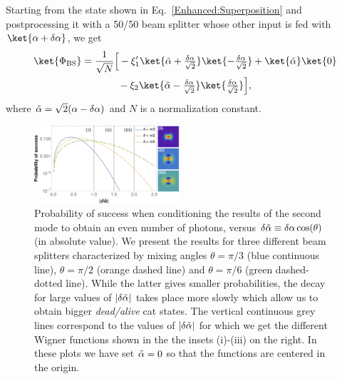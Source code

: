 Starting from the state shown in Eq.~\eqref{Enhanced:Superposition} and postprocessing it with a 50/50 beam splitter whose other input is fed with $\ket{\alpha + \delta \alpha}$, we get
\begin{equation}
    \begin{aligned}
    \ket{\Phi_\text{BS}}
        &= \dfrac{1}{\sqrt{N}}
            \Big[
                 -\xi'_1 \ket{\Tilde{\alpha} + \tfrac{\delta\alpha}{\sqrt{2}}}\ket{-\tfrac{\delta \alpha}{\sqrt{2}}}
                 + \ket{\Tilde{\alpha}}
                    \ket{0}\\
                &\hspace{1.3cm}- \xi_2 \ket{\Tilde{\alpha} - \tfrac{\delta\alpha}{\sqrt{2}}}\ket{\tfrac{\delta \alpha}{\sqrt{2}}}
            \Big],
    \end{aligned}
\end{equation}
where $\Tilde{\alpha} = \sqrt{2}(\alpha - \delta \alpha)$ and $N$ is a normalization constant.
\begin{figure}
    \centering
    \includegraphics[width =0.48\textwidth]{Fig7.pdf}
    \caption{Probability of success when conditioning the results of the second mode to obtain an even number of photons, versus $\delta \Tilde{\alpha} \equiv \delta \alpha \cos(\theta)$ (in absolute value). We present the results for three different beam splitters characterized by mixing angles $\theta = \pi/3$ (blue continuous line), $\theta = \pi/2$ (orange dashed line) and $\theta = \pi/6$ (green dashed-dotted line). While the latter gives smaller probabilities, the decay for large values of $|\delta \Tilde{\alpha}|$ takes place more slowly which allow us to obtain bigger \emph{dead/alive} cat states. The vertical continuous grey lines correspond to the values of $|\delta \Tilde{\alpha}|$ for which we get the different Wigner functions shown in the the insets (i)-(iii) on the right. In these plots we have set $\Tilde{\alpha} = 0$ so that the functions are centered in the origin.}
    \label{Fig7}
\end{figure}

